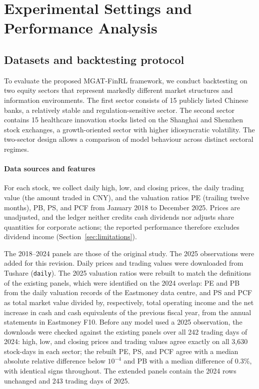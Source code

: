 \section{Experimental Settings and Performance Analysis}\label{sec5}

\subsection{Datasets and backtesting protocol}
To evaluate the proposed MGAT-FinRL framework, we conduct backtesting on two equity sectors that represent markedly different market structures and information environments. The first sector consists of 15 publicly listed Chinese banks, a relatively stable and regulation-sensitive sector. The second sector contains 15 healthcare innovation stocks listed on the Shanghai and Shenzhen stock exchanges, a growth-oriented sector with higher idiosyncratic volatility. The two-sector design allows a comparison of model behaviour across distinct sectoral regimes.

\paragraph{Data sources and features}
{\color{blue}For each stock, we collect daily high, low, and closing prices, the daily trading value (the amount traded in CNY), and the valuation ratios PE (trailing twelve months), PB, PS, and PCF from January 2018 to December 2025. Prices are unadjusted, and the ledger neither credits cash dividends nor adjusts share quantities for corporate actions; the reported performance therefore excludes dividend income (Section~\ref{sec:limitations}).

The 2018--2024 panels are those of the original study. The 2025 observations were added for this revision. Daily prices and trading values were downloaded from Tushare (\texttt{daily}). The 2025 valuation ratios were rebuilt to match the definitions of the existing panels, which were identified on the 2024 overlap: PE and PB from the daily valuation records of the Eastmoney data centre, and PS and PCF as total market value divided by, respectively, total operating income and the net increase in cash and cash equivalents of the previous fiscal year, from the annual statements in Eastmoney F10. Before any model used a 2025 observation, the downloads were checked against the existing panels over all 242 trading days of 2024: high, low, and closing prices and trading values agree exactly on all 3{,}630 stock-days in each sector; the rebuilt PE, PS, and PCF agree with a median absolute relative difference below $10^{-4}$ and PB with a median difference of 0.3\%, with identical signs throughout. The extended panels contain the 2024 rows unchanged and 243 trading days of 2025.\par}

